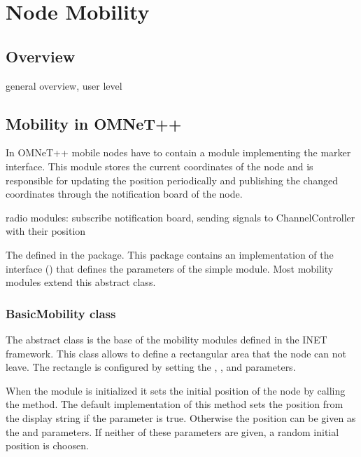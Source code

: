 \chapter{Node Mobility}
\label{cha:mobility}


\section{Overview}

general overview, user level

\section{Mobility in OMNeT++}

In OMNeT++ mobile nodes have to contain a module implementing the
 marker interface. This module stores the current
coordinates of the node and is responsible for updating the position
periodically and publishing the changed coordinates through the
notification board of the node.

radio modules: subscribe notification board, sending signals to
ChannelController with their position

The  defined in the  package.
This package contains an implementation of the interface
() that defines the parameters of the
 simple module. Most mobility modules extend this
abstract class.


\subsection{BasicMobility class}

The abstract  class is the base of the mobility
modules defined in the INET framework. This class allows to define
a rectangular area that the node can not leave. The rectangle is configured
by setting the , ,
 and  parameters.

When the module is initialized it sets the initial position of the node
by calling the  method.
The default implementation of this method sets the position from the
display string if the  parameter is true.
Otherwise the position can be given as the  and
 parameters. If neither of these parameters are given,
a random initial position is choosen.

